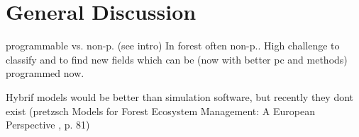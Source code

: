 \chapter{General Discussion}
\label{chap:discussion}
programmable vs. non-p. (see intro) In forest often non-p.. High challenge to classify and to find new fields which can be (now with better pc and methods) programmed now.

Hybrif models would be better than simulation software, but recently they dont exist (pretzsch Models for Forest Ecosystem Management: A European Perspective
, p. 81)